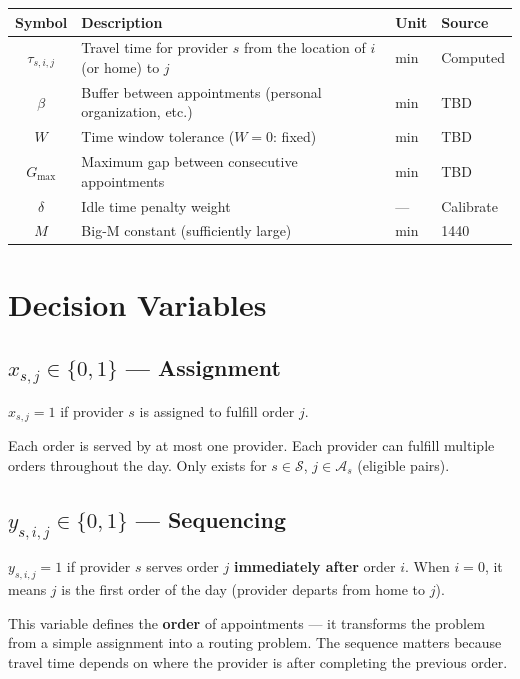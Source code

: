 \documentclass[11pt,a4paper]{article}
\begin{document}
\begin{tabular}{@{}cp{7cm}ll@{}}
\toprule
\textbf{Symbol} & \textbf{Description} & \textbf{Unit} & \textbf{Source} \\
\midrule
$\tau_{s,i,j}$ & Travel time for provider $s$ from the location of $i$ (or home) to $j$ & min & Computed \\
$\beta$ & Buffer between appointments (personal organization, etc.) & min & TBD \\
$W$ & Time window tolerance ($W{=}0$: fixed) & min & TBD \\
$G_{\max}$ & Maximum gap between consecutive appointments & min & TBD \\
$\delta$ & Idle time penalty weight & --- & Calibrate \\
$M$ & Big-M constant (sufficiently large) & min & 1440 \\
\bottomrule
\end{tabular}

\section{Decision Variables}

\subsection{$x_{s,j} \in \{0,1\}$ --- Assignment}

$x_{s,j} = 1$ if provider $s$ is assigned to fulfill order $j$.

Each order is served by at most one provider. Each provider can fulfill multiple orders throughout the day. Only exists for $s \in \mathcal{S}$, $j \in \mathcal{A}_s$ (eligible pairs).

\subsection{$y_{s,i,j} \in \{0,1\}$ --- Sequencing}

$y_{s,i,j} = 1$ if provider $s$ serves order $j$ \textbf{immediately after} order $i$. When $i = 0$, it means $j$ is the first order of the day (provider departs from home to $j$).

This variable defines the \textbf{order} of appointments --- it transforms the problem from a simple assignment into a routing problem. The sequence matters because travel time depends on where the provider is after completing the previous order.
\end{document}
